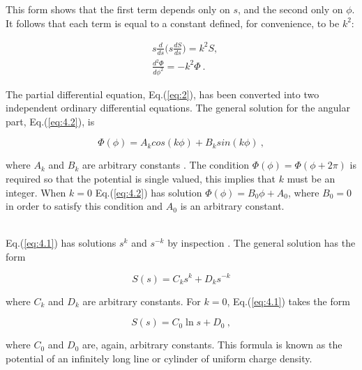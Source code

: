 \documentclass[a4paper]{jpconf}
\begin{document}
\noindent This form shows that the first term depends only on $s$, and the second only on $\phi$. It follows that  each term is equal to a constant defined, for convenience, to be $k^2$:

\begin{subequations}
\begin{align}
&s\frac{d}{ds}\bigg(s \frac{dS}{ds}\bigg) = k^2 S, \label{eq:4.1}\\ 
&\frac{d^2 \Phi}{d \phi^2} = - k^2 \Phi ~. \label{eq:4.2}
\end{align}
\label{eq:4}
\end{subequations} 

\noindent The partial differential equation, Eq.(\ref{eq:2}), has been converted into two independent ordinary differential equations. The general solution for the angular part, Eq.(\ref{eq:4.2}), is

\begin{equation}
\Phi(\phi) = A_k cos(k \phi) + B_k sin(k \phi)~,
\label{eq:phi}
\end{equation}

\noindent where $A_k$ and $B_k$ are arbitrary constants \cite{RHB-MathematicalMethods}. The condition $\Phi(\phi) = \Phi(\phi + 2 \pi)$ is required so that the potential is single valued, this implies that $k$ must be an integer. %
When $k = 0$ Eq.(\ref{eq:4.2}) has solution $\Phi(\phi) = B_0 \phi + A_0$, where $B_0 = 0$ in order to satisfy this condition and $A_0$ is an arbitrary constant. \\ \\ \par 
Eq.(\ref{eq:4.1}) has solutions $s^k$ and $s^{-k}$ by inspection \cite{griffiths-introElec}. The general solution has the form

\begin{equation}
S(s) = C_k s^k + D_k s^{-k}
\label{eq:s}
\end{equation} 

\noindent where $C_k$ and $D_k$ are arbitrary constants. For $k = 0$, Eq.(\ref{eq:4.1}) takes the form

\begin{equation}
S(s) = C_0 \ln{s} + D_0~,
\label{eq:s2}
\end{equation}

\noindent where $C_0$ and $D_0$ are, again, arbitrary constants. This formula is known as the potential of an infinitely long line or cylinder of uniform charge density. \par
\end{document}
